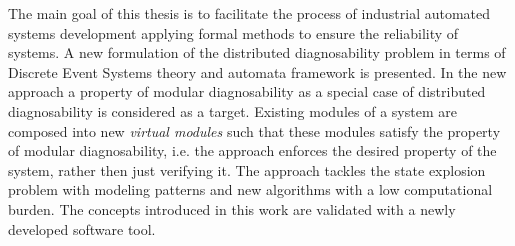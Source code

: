 % 
% 
%

The main goal of this thesis is to facilitate the process of
industrial automated systems development applying formal methods to ensure the
reliability of systems. A new formulation of the distributed diagnosability
problem in terms of Discrete Event Systems theory and automata framework is
presented. In the new approach a property of modular diagnosability as a
special case of distributed diagnosability is considered as a target. Existing
modules of a system are composed into new \emph{virtual modules} such that these
modules satisfy the property of modular diagnosability, i.e. the approach
enforces the desired property of the system, rather then just verifying it.
The approach tackles the state explosion problem with modeling patterns and new
algorithms with a low computational burden. The concepts introduced in this work
are validated with a newly developed software tool.
